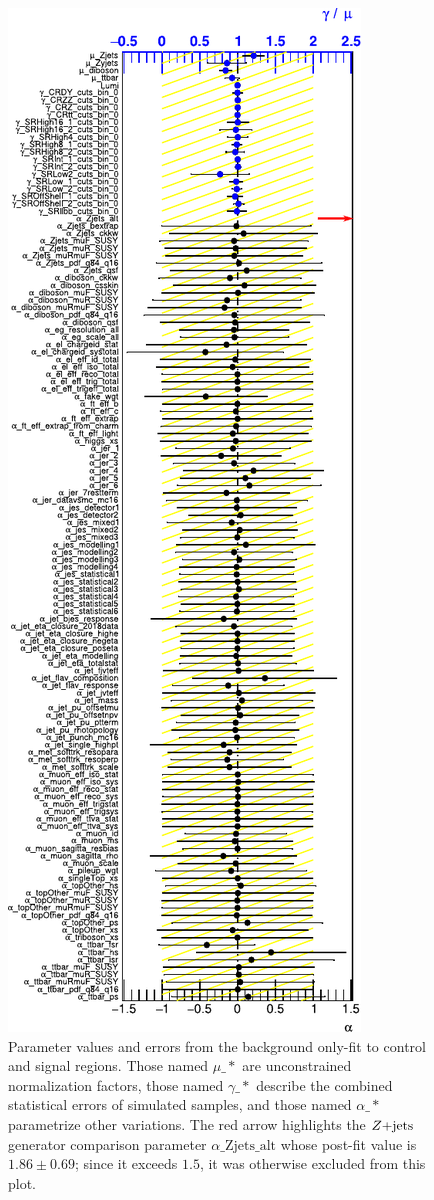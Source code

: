 \begin{figure}[tp]
\centering
\includegraphics[height=0.81\textheight]{figures/2ljets_fit_parameters.pdf}
\caption[
Parameter values and errors from the background only-fit to control and signal
regions
]{%
Parameter values and errors from the background only-fit to control and signal
regions.
Those named $\mu\_*$ are unconstrained normalization factors,
those named $\gamma\_*$ describe the combined statistical errors of simulated
samples,
and those named $\alpha\_*$ parametrize other variations.
The red arrow highlights the $Z\mathrm{+jets}$ generator comparison parameter
$\alpha\mathrm{\_Zjets\_alt}$ whose post-fit value is
$1.86 \pm 0.69$;
since it exceeds $1.5$, it was otherwise excluded from this plot.
}
\label{fig:2ljets_fit_parameters}
\end{figure}


